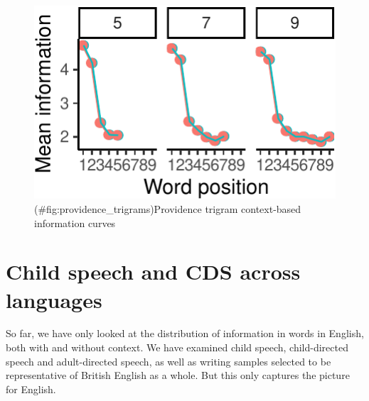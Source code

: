 \documentclass[man,floatsintext]{apa6}
\begin{document}
\begin{figure}
\centering
\includegraphics{figs/providence_trigrams-1.pdf}
\caption{(\#fig:providence\_trigrams)Providence trigram context-based information curves}
\end{figure}

\hypertarget{child-speech-and-cds-across-languages}{%
\section{Child speech and CDS across languages}\label{child-speech-and-cds-across-languages}}

So far, we have only looked at the distribution of information in words in English, both with and without context. We have examined child speech, child-directed speech and adult-directed speech, as well as writing samples selected to be representative of British English as a whole. But this only captures the picture for English.
\end{document}
